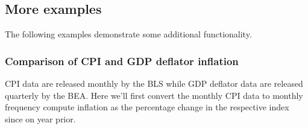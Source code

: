 \documentclass[letterpaper,10pt,openany,oneside,english]{sphinxmanual}
\begin{document}
\noindent{}


\subsection{More examples}
\label{\detokenize{fredpy_examples:More-examples}}
The following examples demonstrate some additional 
functionality.


\subsubsection{Comparison of CPI and GDP deflator inflation}
\label{\detokenize{fredpy_examples:Comparison-of-CPI-and-GDP-deflator-inflation}}
CPI data are released monthly by the BLS while GDP deflator data are
released quarterly by the BEA. Here we'll first convert the monthly CPI
data to monthly frequency compute inflation as the percentage change in
the respective index since on year prior.
\end{document}
